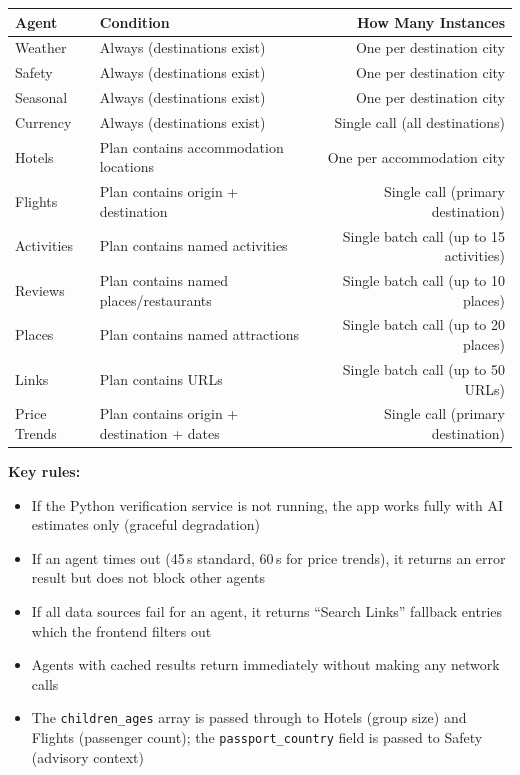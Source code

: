 \documentclass[11pt,a4paper]{article}
\begin{document}
{\small
\begin{tabularx}{\textwidth}{@{}L{2.4cm}L{3cm}R@{}}
\toprule
\textbf{Agent} & \textbf{Condition} & \textbf{How Many Instances} \\
\midrule
Weather & Always (destinations exist) & One per destination city \\[4pt]
Safety & Always (destinations exist) & One per destination city \\[4pt]
Seasonal & Always (destinations exist) & One per destination city \\[4pt]
Currency & Always (destinations exist) & Single call (all destinations) \\[4pt]
Hotels & Plan contains accommodation locations & One per accommodation city \\[4pt]
Flights & Plan contains origin + destination & Single call (primary destination) \\[4pt]
Activities & Plan contains named activities & Single batch call (up to 15 activities) \\[4pt]
Reviews & Plan contains named places/restaurants & Single batch call (up to 10 places) \\[4pt]
Places & Plan contains named attractions & Single batch call (up to 20 places) \\[4pt]
Links & Plan contains URLs & Single batch call (up to 50 URLs) \\[4pt]
Price Trends & Plan contains origin + destination + dates & Single call (primary destination) \\
\bottomrule
\end{tabularx}}

\textbf{Key rules:}
\begin{itemize}[nosep]
\item If the Python verification service is not running, the app works fully with AI estimates only (graceful degradation)
\item If an agent times out (45\,s standard, 60\,s for price trends), it returns an error result but does not block other agents
\item If all data sources fail for an agent, it returns ``Search Links'' fallback entries which the frontend filters out
\item Agents with cached results return immediately without making any network calls
\item The \texttt{children\_ages} array is passed through to Hotels (group size) and Flights (passenger count); the \texttt{passport\_country} field is passed to Safety (advisory context)
\end{itemize}
\end{document}
